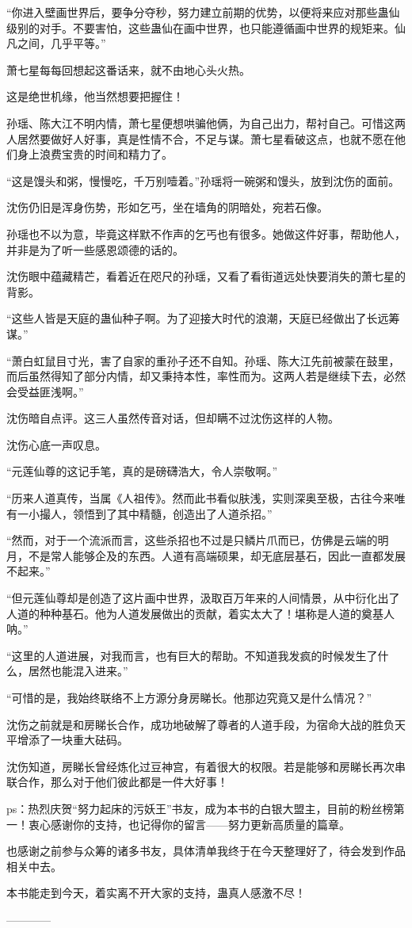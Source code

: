 \begin{this_body}
“你进入壁画世界后，要争分夺秒，努力建立前期的优势，以便将来应对那些蛊仙级别的对手。不要害怕，这些蛊仙在画中世界，也只能遵循画中世界的规矩来。仙凡之间，几乎平等。”

萧七星每每回想起这番话来，就不由地心头火热。

这是绝世机缘，他当然想要把握住！

孙瑶、陈大江不明内情，萧七星便想哄骗他俩，为自己出力，帮衬自己。可惜这两人居然要做好人好事，真是性情不合，不足与谋。萧七星看破这点，也就不愿在他们身上浪费宝贵的时间和精力了。

“这是馒头和粥，慢慢吃，千万别噎着。”孙瑶将一碗粥和馒头，放到沈伤的面前。

沈伤仍旧是浑身伤势，形如乞丐，坐在墙角的阴暗处，宛若石像。

孙瑶也不以为意，毕竟这样默不作声的乞丐也有很多。她做这件好事，帮助他人，并非是为了听一些感恩颂德的话的。

沈伤眼中蕴藏精芒，看着近在咫尺的孙瑶，又看了看街道远处快要消失的萧七星的背影。

“这些人皆是天庭的蛊仙种子啊。为了迎接大时代的浪潮，天庭已经做出了长远筹谋。”

“萧白虹鼠目寸光，害了自家的重孙子还不自知。孙瑶、陈大江先前被蒙在鼓里，而后虽然得知了部分内情，却又秉持本性，率性而为。这两人若是继续下去，必然会受益匪浅啊。”

沈伤暗自点评。这三人虽然传音对话，但却瞒不过沈伤这样的人物。

沈伤心底一声叹息。

“元莲仙尊的这记手笔，真的是磅礴浩大，令人崇敬啊。”

“历来人道真传，当属《人祖传》。然而此书看似肤浅，实则深奥至极，古往今来唯有一小撮人，领悟到了其中精髓，创造出了人道杀招。”

“然而，对于一个流派而言，这些杀招也不过是只鳞片爪而已，仿佛是云端的明月，不是常人能够企及的东西。人道有高端硕果，却无底层基石，因此一直都发展不起来。”

“但元莲仙尊却是创造了这片画中世界，汲取百万年来的人间情景，从中衍化出了人道的种种基石。他为人道发展做出的贡献，着实太大了！堪称是人道的奠基人呐。”

“这里的人道进展，对我而言，也有巨大的帮助。不知道我发疯的时候发生了什么，居然也能混入进来。”

“可惜的是，我始终联络不上方源分身房睇长。他那边究竟又是什么情况？”

沈伤之前就是和房睇长合作，成功地破解了尊者的人道手段，为宿命大战的胜负天平增添了一块重大砝码。

沈伤知道，房睇长曾经炼化过豆神宫，有着很大的权限。若是能够和房睇长再次串联合作，那么对于他们彼此都是一件大好事！

ps：热烈庆贺“努力起床的污妖王”书友，成为本书的白银大盟主，目前的粉丝榜第一！衷心感谢你的支持，也记得你的留言——努力更新高质量的篇章。

也感谢之前参与众筹的诸多书友，具体清单我终于在今天整理好了，待会发到作品相关中去。

本书能走到今天，着实离不开大家的支持，蛊真人感激不尽！

------------

\end{this_body}

